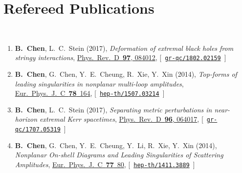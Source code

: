 \newcommand{\grqc}[1]{\href{http://arxiv.org/abs/#1}{\texttt{gr-qc/#1}}}
\newcommand{\hepth}[1]{\href{http://arxiv.org/abs/#1}{\texttt{hep-th/#1}}}


\newcommand{\baoyi}[1]{\textbf{B.~Chen},}


\section*{\sc Refereed Publications}~
\vspace{-.2in}

\begin{enumerate}

      \item
    \baoyi,
    L.~C.~Stein
    (2017),
    {\it Deformation of extremal black holes from stringy interactions},
    \href{http://dx.doi.org/10.1103/PhysRevD.97.084012}{Phys.~Rev.~D~{\bf 97}, 084012},
    [~\grqc{1802.02159}~]
  
      \item 
    \baoyi,
    G.~Chen,
    Y.~E.~Cheung,           
    R.~Xie,
    Y.~Xin
    (2014),
    {\it Top-forms of leading singularities in nonplanar multi-loop amplitudes},
   \href{http://dx.doi.org/10.1140/epjc/s10052-018-5629-z}{Eur.~Phys.~J.~C~{\bf78}~164},
    [~\hepth{1507.03214}~]

  
    \item
    \baoyi,
    L.~C.~Stein
    (2017),
    {\it Separating metric perturbations in near-horizon extremal Kerr spacetimes},
    \href{http://dx.doi.org/10.1103/PhysRevD.96.064017}{Phys.~Rev.~D~{\bf 96}, 064017},
    [~\grqc{1707.05319}~]

    \item 
    \baoyi,
    G.~Chen,
    Y.~E.~Cheung,  
    Y.~Li,         
    R.~Xie,
    Y.~Xin
    (2014),
    {\it Nonplanar On-shell Diagrams and Leading Singularities of Scattering Amplitudes},
    \href{http://dx.doi.org/10.1140/epjc/s10052-017-4659-2}{Eur.~Phys.~J.~C~{\bf77}~80},
    [~\hepth{1411.3889}~]
\end{enumerate}

